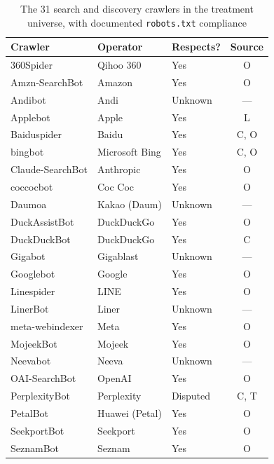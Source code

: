 \begin{table}[p]
\centering
\begin{threeparttable}
\caption{The 31 search and discovery crawlers in the treatment universe, with documented \texttt{robots.txt} compliance}
\label{tab:crawlers}
\footnotesize
\begin{tabular}{lllc}
\toprule
Crawler & Operator & Respects? & Source \\
\midrule
360Spider        & Qihoo 360         & Yes      & O \\
Amzn-SearchBot   & Amazon            & Yes      & O \\
Andibot          & Andi              & Unknown  & --- \\
Applebot         & Apple             & Yes      & L \\
Baiduspider      & Baidu             & Yes      & C, O \\
bingbot          & Microsoft Bing    & Yes      & C, O \\
Claude-SearchBot & Anthropic         & Yes      & O \\
coccocbot        & Coc Coc           & Yes      & O \\
Daumoa           & Kakao (Daum)      & Unknown  & --- \\
DuckAssistBot    & DuckDuckGo        & Yes      & O \\
DuckDuckBot      & DuckDuckGo        & Yes      & C \\
Gigabot          & Gigablast         & Unknown  & --- \\
Googlebot        & Google            & Yes      & O \\
Linespider       & LINE              & Yes      & O \\
LinerBot         & Liner             & Unknown  & --- \\
meta-webindexer  & Meta              & Yes      & O \\
MojeekBot        & Mojeek            & Yes      & O \\
Neevabot         & Neeva             & Unknown  & --- \\
OAI-SearchBot    & OpenAI            & Yes      & O \\
PerplexityBot    & Perplexity        & Disputed & C, T \\
PetalBot         & Huawei (Petal)    & Yes      & O \\
SeekportBot      & Seekport          & Yes      & O \\
SeznamBot        & Seznam            & Yes      & O \\

\end{tabular}
\end{threeparttable}
\end{table}
